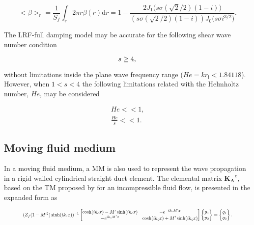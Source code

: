 \documentclass[12pt]{article}
\begin{document}
\begin{equation} \label{eq:alpha_avrg}
	<\beta>_r = \frac{1}{S_f} \int_{r} 2\pi r \beta(r) \text{d}r = 1 - \frac{2 J_1 \big( s \sigma (\sqrt{2}/2) (1 - i) \big) }{  (s \sigma (\sqrt{2}/2)  (1 - i) ) J_0 \big( s \sigma i^{3/2} \big)   }.
\end{equation}

%

\noindent The LRF-full damping model may be accurate for the following shear wave number condition \cite{TIJDEMAN19751} 

\begin{equation}
	s \geq 4, \\	
\end{equation}

\noindent without limitations inside the plane wave frequency range ($He= k r_{\text{i}} < 1.84118$). However, when $ 1 < s < 4 $ the following limitations related with the Helmholtz number, $He$, may be considered \cite[see Figs.~9~and~10 in][]{TIJDEMAN19751}

\begin{gather}
	He << 1, \\
	\frac{He}{s} << 1.	
\end{gather}


\subsection{Moving fluid medium}

In a moving fluid medium, a \acrfull{MM} is also used to represent the wave propagation in a rigid walled cylindrical straight duct element. The elemental matrix $\mathbf{K_{\text{A}}}^e$, based on the \acrfull{TM} proposed by \cite{TO_meanflow} for an incompressible fluid flow, is presented in the expanded form as

\begin{equation} \label{eq:MM_flow-acoustic}
	\resizebox{0.9\textwidth}{!}{
		$	(Z_f (1 - M'^2) \sinh(i k_c x) )^{-1}
		\begin{bmatrix}
			\cosh(i k_c x) - M' \sinh(i k_c x) &  - e^{-i k_c M' x}  \\
			- e^{i k_c M' x} & \cosh(i k_c x) + M' \sinh(i k_c x)
		\end{bmatrix}
		\begin{Bmatrix}
			p_1 \\
			p_2
		\end{Bmatrix}
		=
		\begin{Bmatrix}
			q_1 \\
			q_2 
		\end{Bmatrix}.$
	}
\end{equation}
\end{document}
